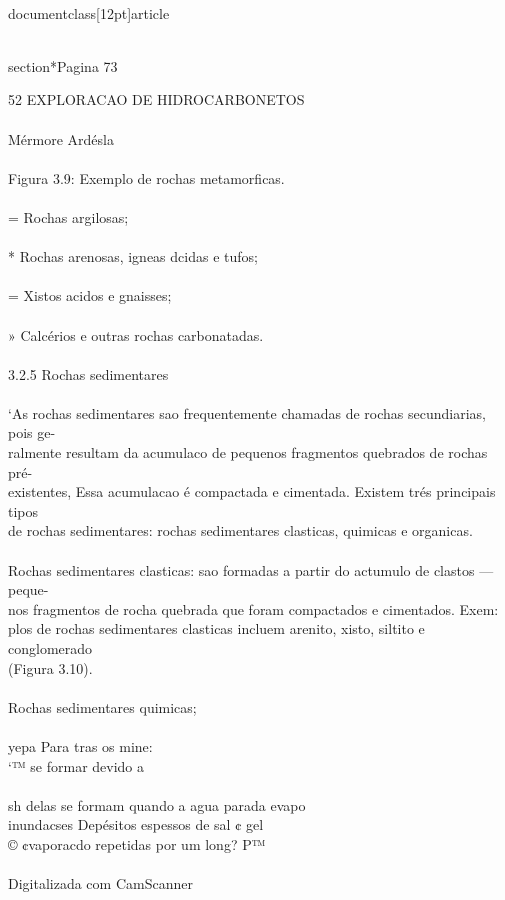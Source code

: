 \\documentclass[12pt]{article}
\begin{document}
\\section*{Pagina 73}

52 EXPLORACAO DE HIDROCARBONETOS\\
\\
Mérmore Ardésla\\
\\
Figura 3.9: Exemplo de rochas metamorficas.\\
\\
= Rochas argilosas;\\
\\
* Rochas arenosas, igneas dcidas e tufos;\\
\\
= Xistos acidos e gnaisses;\\
\\
» Calcérios e outras rochas carbonatadas.\\
\\
3.2.5 Rochas sedimentares\\
\\
‘As rochas sedimentares sao frequentemente chamadas de rochas secundiarias, pois ge-\\
ralmente resultam da acumulaco de pequenos fragmentos quebrados de rochas pré-\\
existentes, Essa acumulacao é compactada e cimentada. Existem trés principais tipos\\
de rochas sedimentares: rochas sedimentares clasticas, quimicas e organicas.\\
\\
Rochas sedimentares clasticas: sao formadas a partir do actumulo de clastos — peque-\\
nos fragmentos de rocha quebrada que foram compactados e cimentados. Exem:\\
plos de rochas sedimentares clasticas incluem arenito, xisto, siltito e conglomerado\\
(Figura 3.10).\\
\\
Rochas sedimentares quimicas;\\
\\
yepa Para tras os mine:\\
‘™ se formar devido a\\
\\
sh delas se formam quando a agua parada evapo\\
inundacses Depésitos espessos de sal ¢ gel\\
© ¢vaporacdo repetidas por um long? P™\\
\\
Digitalizada com CamScanner\\
\end{document}
